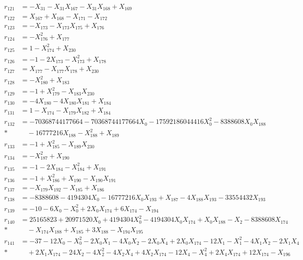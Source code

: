 \begin{align*}
r_{121} &= -X_{31} - X_{31}X_{167} - X_{31}X_{168} + X_{169} \\[3pt]
r_{122} &= X_{167} + X_{168} - X_{171} - X_{172} \\[3pt]
r_{123} &= -X_{173} - X_{173}X_{175} + X_{176} \\[3pt]
r_{124} &= -X_{176}^{2} + X_{177} \\[3pt]
r_{125} &= 1 - X_{174}^{2} + X_{230} \\[3pt]
r_{126} &= -1 - 2X_{173} - X_{173}^{2} + X_{178} \\[3pt]
r_{127} &= X_{177} - X_{177}X_{178} + X_{230} \\[3pt]
r_{128} &= -X_{180}^{2} + X_{183} \\[3pt]
r_{129} &= -1 + X_{179}^{2} - X_{183}X_{230} \\[3pt]
r_{130} &= -4X_{180} - 4X_{180}X_{181} + X_{184} \\[3pt]
r_{131} &= 1 - X_{174} - X_{179}X_{182} + X_{184} \\[3pt]
r_{132} &= -70368744177664 - 70368744177664X_{0} - 17592186044416X_{0}^{2} - 8388608X_{0}X_{188} \\*
&\quad  - 16777216X_{188} - X_{188}^{2} + X_{189} \\[3pt]
r_{133} &= -1 + X_{185}^{2} - X_{189}X_{230} \\[3pt]
r_{134} &= -X_{187}^{2} + X_{190} \\[3pt]
r_{135} &= -1 - 2X_{184} - X_{184}^{2} + X_{191} \\[3pt]
r_{136} &= -1 + X_{186}^{2} + X_{190} - X_{190}X_{191} \\[3pt]
r_{137} &= -X_{179}X_{192} - X_{185} + X_{186} \\[3pt]
r_{138} &= -8388608 - 4194304X_{0} - 16777216X_{0}X_{193} + X_{187} - 4X_{188}X_{193} - 33554432X_{193} \\[3pt]
r_{139} &= -10 - 6X_{0} - X_{0}^{2} + 2X_{0}X_{174} + 6X_{174} - X_{194} \\[3pt]
r_{140} &= 25165823 + 20971520X_{0} + 4194304X_{0}^{2} - 4194304X_{0}X_{174} + X_{0}X_{188} - X_{2} - 8388608X_{174} \\*
&\quad  - X_{174}X_{188} + X_{185} + 3X_{188} - X_{194}X_{195} \\[3pt]
r_{141} &= -37 - 12X_{0} - X_{0}^{2} - 2X_{0}X_{1} - 4X_{0}X_{2} - 2X_{0}X_{4} + 2X_{0}X_{174} - 12X_{1} - X_{1}^{2} - 4X_{1}X_{2} - 2X_{1}X_{4} \\*
&\quad  + 2X_{1}X_{174} - 24X_{2} - 4X_{2}^{2} - 4X_{2}X_{4} + 4X_{2}X_{174} - 12X_{4} - X_{4}^{2} + 2X_{4}X_{174} + 12X_{174} - X_{196} \\[3pt]

\end{align*}
